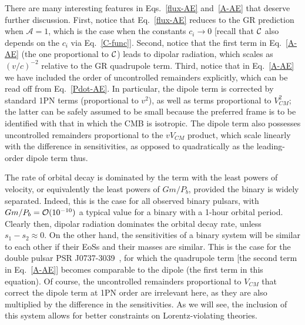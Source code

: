 \documentclass[prd,aps,twocolumn,nofootinbib,showpacs,superscriptaddress]{revtex4-1}
\begin{document}
There are many interesting features in Eqs.~\eqref{flux-AE} and~\eqref{A-AE} that deserve further discussion. 
%
First, notice that Eq.~\eqref{flux-AE} reduces to the GR prediction when $\mathcal{A}=1$, which is the case when the constants $c_{i} \to 0$ [recall that ${\cal{C}}$ also depends on the $c_{i}$ via Eq.~\eqref{C-func}]. 
%
Second, notice that the first term in Eq.~\eqref{A-AE} (the one proportional to ${\cal{C}}$) leads to dipolar radiation, which scales as $(v/c)^{-2}$ relative to the GR quadrupole term. 
%
Third, notice that in Eq.~\eqref{A-AE} we have included the order of uncontrolled remainders explicitly, which can be read off from Eq.~\eqref{Pdot-AE}. In particular, the dipole term is corrected by standard 1PN terms (proportional to $v^{2}$), as well as terms proportional to $V_{CM}^{2}$; the latter  can be safely  assumed to be small because the preferred frame is to be identified with that in which the CMB is isotropic. The dipole term also possesses uncontrolled remainders proportional to the $v V_{CM}$ product, which scale linearly with the difference in sensitivities, as opposed to quadratically as the leading-order dipole term thus. 
  
The rate of orbital decay is dominated by the term with the least powers of velocity, or equivalently the least powers of $G m/P_{b}$, provided the binary is widely separated. Indeed, this is the case for all observed binary pulsars, with $G m/P_{b} = {\cal{O}}(10^{-10})$ a typical value for a binary with a 1-hour orbital period. Clearly then, dipolar radiation dominates the orbital decay rate, unless $s_{1} - s_{2} \approx 0$. On the other hand, the sensitivities of a binary system will be similar to each other if their EoSs and their masses are similar. This is the case for the double pulsar PSR J0737-3039~\cite{kramer-double-pulsar}, for which the quadrupole term [the second term in Eq.~\eqref{A-AE}] becomes comparable to the dipole (the first term in this equation). Of course, the uncontrolled remainders  proportional to $V_{CM}$ that correct  the dipole term at 1PN order  are irrelevant here, as they are also multiplied by the difference in the sensitivities. As we will see, the inclusion of this system 
allows for better constraints on Lorentz-violating theories. 
\end{document}
